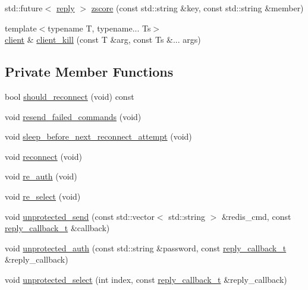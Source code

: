 \begin{DoxyCompactItemize}
\item 
std\+::future$<$ \hyperlink{classcpp__redis_1_1reply}{reply} $>$ \hyperlink{classcpp__redis_1_1client_a72b20e861696db3e4dd5a4af96a1b427}{zscore} (const std\+::string \&key, const std\+::string \&member)
\item 
{\footnotesize template$<$typename T, typename... Ts$>$ }\\\hyperlink{classcpp__redis_1_1client}{client} \& \hyperlink{classcpp__redis_1_1client_ab3095cf010e10e9aa0b17a4408e6652e}{client\+\_\+kill} (const T \&arg, const Ts \&... args)
\end{DoxyCompactItemize}
\subsection*{Private Member Functions}
\begin{DoxyCompactItemize}
\item 
bool \hyperlink{classcpp__redis_1_1client_a62dc004b1d1e73787b8b211ecc8f77bb}{should\+\_\+reconnect} (void) const
\item 
void \hyperlink{classcpp__redis_1_1client_a6cf006e4c6e69a00b63cc7e1281d326b}{resend\+\_\+failed\+\_\+commands} (void)
\item 
void \hyperlink{classcpp__redis_1_1client_ae615fdb05872724b2f8337f6cdeb1889}{sleep\+\_\+before\+\_\+next\+\_\+reconnect\+\_\+attempt} (void)
\item 
void \hyperlink{classcpp__redis_1_1client_aa27639ab1fea971f50664cbb20918b34}{reconnect} (void)
\item 
void \hyperlink{classcpp__redis_1_1client_a89c93f201d057dfa2eb8c7b80ff4f5c9}{re\+\_\+auth} (void)
\item 
void \hyperlink{classcpp__redis_1_1client_abc1daa18274ff5994c88600a2c2f3c67}{re\+\_\+select} (void)
\item 
void \hyperlink{classcpp__redis_1_1client_a89e9857149094a693abb2e4015779231}{unprotected\+\_\+send} (const std\+::vector$<$ std\+::string $>$ \&redis\+\_\+cmd, const \hyperlink{classcpp__redis_1_1client_a061a1140d36d2eaeda82b09a0bb3f9f2}{reply\+\_\+callback\+\_\+t} \&callback)
\item 
void \hyperlink{classcpp__redis_1_1client_a0bb20d17620ff63219f7e932d3baa0c6}{unprotected\+\_\+auth} (const std\+::string \&password, const \hyperlink{classcpp__redis_1_1client_a061a1140d36d2eaeda82b09a0bb3f9f2}{reply\+\_\+callback\+\_\+t} \&reply\+\_\+callback)
\item 
void \hyperlink{classcpp__redis_1_1client_ae2ac4b582d4d656b3c76450ea88c7b58}{unprotected\+\_\+select} (int index, const \hyperlink{classcpp__redis_1_1client_a061a1140d36d2eaeda82b09a0bb3f9f2}{reply\+\_\+callback\+\_\+t} \&reply\+\_\+callback)

\end{DoxyCompactItemize}
